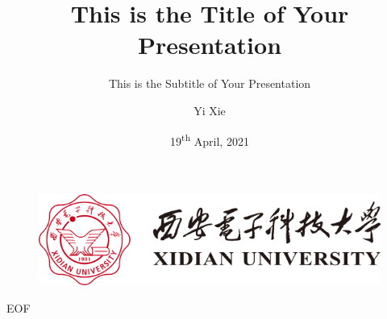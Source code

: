 \documentclass[aspectratio=169]{beamer}
\author{Yi Xie}
\title[This is the Short Title of Your Presentation]{This is the Title of Your Presentation}
\subtitle{This is the Subtitle of Your Presentation}
\institute{School of Cyber Engineering, Xidian University}
\date{19\textsuperscript{th} April, 2021}
\begin{document}
\begin{frame}
    \titlepage
    \vspace{-10pt}
    \begin{figure}[htpb]
        \begin{center}
            \includegraphics[width=0.3\linewidth]{images/xidian-logo.png}
        \end{center}
    \end{figure}
\end{frame}

\begin{frame}
    \tableofcontents[sectionstyle=show,subsectionstyle=show/shaded/hide,subsubsectionstyle=show/shaded/hide]
\end{frame}








\begin{frame}[allowframebreaks]
    \printbibliography
\end{frame}

\begin{frame}
    \begin{center}
        {\Huge EOF}
    \end{center}
\end{frame}
\end{document}
